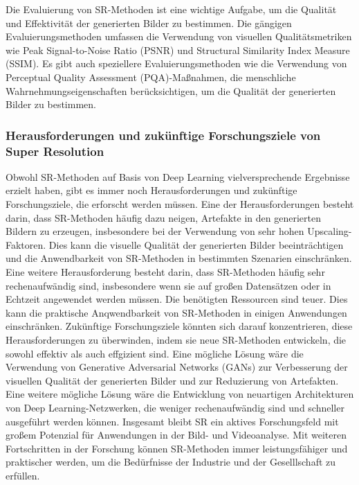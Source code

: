     Die Evaluierung von SR-Methoden ist eine wichtige Aufgabe, um die Qualität und Effektivität der generierten Bilder zu bestimmen. 
    Die gängigen Evaluierungsmethoden umfassen die Verwendung von visuellen Qualitätsmetriken wie Peak Signal-to-Noise Ratio (PSNR) und Structural Similarity Index Measure (SSIM).
    Es gibt auch speziellere Evaluierungsmethoden wie die Verwendung von Perceptual Quality Assessment (PQA)-Maßnahmen, die menschliche Wahrnehmungseigenschaften berücksichtigen, um die Qualität der generierten Bilder zu bestimmen.
    
    \subsubsection{Herausforderungen und zukünftige Forschungsziele von Super Resolution}
    
    Obwohl SR-Methoden auf Basis von Deep Learning vielversprechende Ergebnisse erzielt haben, gibt es immer noch Herausforderungen und zukünftige Forschungsziele, die erforscht werden müssen.
    Eine der Herausforderungen besteht darin, dass SR-Methoden häufig dazu neigen, Artefakte in den generierten Bildern zu erzeugen, insbesondere bei der Verwendung von sehr hohen Upscaling-Faktoren. %
    Dies kann die visuelle Qualität der generierten Bilder beeinträchtigen und die Anwendbarkeit von SR-Methoden in bestimmten Szenarien einschränken.
    Eine weitere Herausforderung besteht darin, dass SR-Methoden häufig sehr rechenaufwändig sind, insbesondere wenn sie auf großen Datensätzen oder in Echtzeit angewendet werden müssen. 
    Die benötigten Ressourcen sind teuer.
    Dies kann die praktische Anqwendbarkeit von SR-Methoden in einigen Anwendungen einschränken.   
    Zukünftige Forschungsziele könnten sich darauf konzentrieren, diese Herausforderungen zu überwinden, indem sie neue SR-Methoden entwickeln, die sowohl effektiv als auch effgizient sind. 
    Eine mögliche Lösung wäre die Verwendung von Generative Adversarial Networks (GANs) zur Verbesserung der visuellen Qualität der generierten Bilder und zur Reduzierung von Artefakten. %
    Eine weitere mögliche Lösung wäre die Entwicklung von neuartigen Architekturen von Deep Learning-Netzwerken, die weniger rechenaufwändig sind und schneller ausgeführt werden können.
    Insgesamt bleibt SR ein aktives Forschungsfeld mit großem Potenzial für Anwendungen in der Bild- und Videoanalyse. 
    Mit weiteren Fortschritten in der Forschung können SR-Methoden immer leistungsfähiger und praktischer werden, um die Bedürfnisse der Industrie und der Geselllschaft zu erfüllen.


